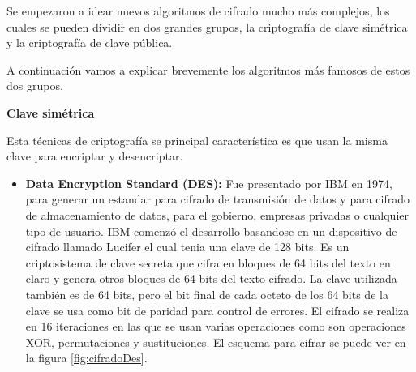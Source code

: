 Se empezaron a idear nuevos algoritmos de cifrado mucho más complejos, los cuales se pueden dividir en dos grandes grupos, la criptografía de clave simétrica y la criptografía de clave pública.

A continuación vamos a explicar brevemente los algoritmos más famosos de estos dos grupos.

\textbf{Clave simétrica}
	
Esta técnicas de criptografía se principal característica es que usan la misma clave para encriptar y desencriptar.
\begin{itemize}

	\item \textbf{Data Encryption Standard (DES):} Fue presentado por IBM en 1974, para generar un estandar para cifrado de transmisión de datos y para cifrado de almacenamiento de datos, para el gobierno, empresas privadas o cualquier tipo de usuario. IBM comenzó el desarrollo basandose en un dispositivo de cifrado llamado Lucifer el cual tenia una clave de 128 bits. Es un criptosistema de clave secreta que cifra en bloques de 64 bits del texto en claro y genera otros bloques de 64 bits del texto cifrado. La clave utilizada también es de 64 bits, pero el bit final de cada octeto de los 64 bits de la clave se usa como bit de paridad para control de errores. El cifrado se realiza en 16 iteraciones en las que se usan varias operaciones como son operaciones XOR, permutaciones y sustituciones. El esquema para cifrar se puede ver en la figura \ref{fig:cifradoDes}.
	

\end{itemize}

